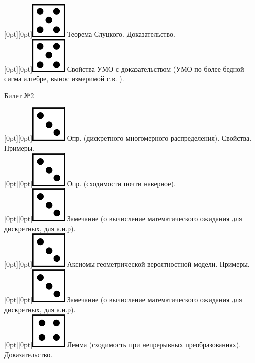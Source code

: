 \documentclass[10pt]{article}
\begin{document}
\raisebox{-1pt}[0pt][0pt]{\includegraphics[width=0.02\linewidth]{5.png}} Теорема Слуцкого. Доказательство. \\

\raisebox{-1pt}[0pt][0pt]{\includegraphics[width=0.02\linewidth]{5.png}} Свойства УМО с доказательством (УМО по более бедной сигма алгебре, вынос измеримой с.в. ). \\

\begin{center} {\Large Билет №2} \end{center} 

\raisebox{-1pt}[0pt][0pt]{\includegraphics[width=0.02\linewidth]{3.png}} Опр. (дискретного многомерного распределения). Свойства. Примеры. \\

\raisebox{-1pt}[0pt][0pt]{\includegraphics[width=0.02\linewidth]{3.png}} Опр. (сходимости почти наверное). \\

\raisebox{-1pt}[0pt][0pt]{\includegraphics[width=0.02\linewidth]{3.png}} Замечание (о вычисление  математического ожидания для дискретных, для а.н.р). \\

\raisebox{-1pt}[0pt][0pt]{\includegraphics[width=0.02\linewidth]{3.png}} Аксиомы геометрической вероятностной модели. Примеры. \\

\raisebox{-1pt}[0pt][0pt]{\includegraphics[width=0.02\linewidth]{3.png}} Замечание (о вычисление  математического ожидания для дискретных, для а.н.р). \\

\raisebox{-1pt}[0pt][0pt]{\includegraphics[width=0.02\linewidth]{4.png}} Лемма  (сходимость при непрерывных преобразованиях). Доказательство. \\
\end{document}
